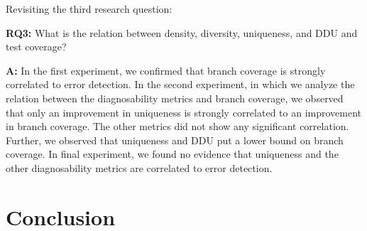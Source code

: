 \documentclass[twoside,a4paper,11pt]{memoir}
\begin{document}
Revisiting the third research question:
\begin{framed}
\noindent
\textbf{RQ3:} What is the relation between density, diversity, uniqueness, and DDU and test coverage?
\end{framed}
\textbf{A:} In the first experiment, we confirmed that branch coverage is strongly correlated to error detection.
In the second experiment, in which we analyze the relation between the diagnosability metrics and branch coverage, we observed that only an improvement in uniqueness is strongly correlated to an improvement in branch coverage.
The other metrics did not show any significant correlation.
Further, we observed that uniqueness and DDU put a lower bound on branch coverage.
In final experiment, we found no evidence that uniqueness and the other diagnosability metrics are correlated to error detection.




\chapter{Conclusion}%
\label{ch:conclusion}




\end{document}

